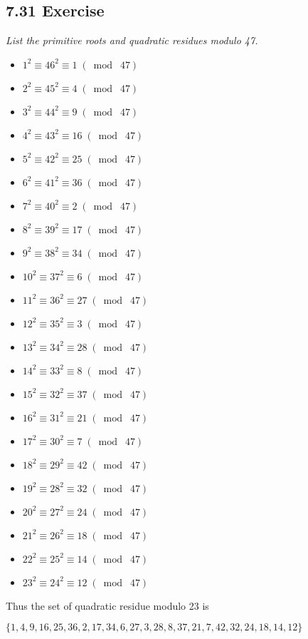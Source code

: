 \documentclass{article}
\begin{document}
\subsection*{7.31 Exercise} 
\quad \textit{List the primitive roots and quadratic residues modulo 47.}
\begin{itemize}
    \item $1^2 \equiv 46^2 \equiv 1 \;(\bmod\; 47)$
    \item $2^2 \equiv 45^2 \equiv 4 \;(\bmod\; 47)$
    \item $3^2 \equiv 44^2 \equiv 9 \;(\bmod\; 47)$
    \item $4^2 \equiv 43^2 \equiv 16 \;(\bmod\; 47)$
    \item $5^2 \equiv 42^2 \equiv 25 \;(\bmod\; 47)$
    \item $6^2 \equiv 41^2 \equiv 36 \;(\bmod\; 47)$
    \item $7^2 \equiv 40^2 \equiv 2 \;(\bmod\; 47)$
    \item $8^2 \equiv 39^2 \equiv 17 \;(\bmod\; 47)$
    \item $9^2 \equiv 38^2 \equiv 34 \;(\bmod\; 47)$
    \item $10^2 \equiv 37^2 \equiv 6 \;(\bmod\; 47)$
    \item $11^2 \equiv 36^2 \equiv 27\;(\bmod\; 47)$
    \item $12^2 \equiv 35^2 \equiv 3 \;(\bmod\; 47)$
    \item $13^2 \equiv 34^2 \equiv 28 \;(\bmod\; 47)$
    \item $14^2 \equiv 33^2 \equiv 8 \;(\bmod\; 47)$
    \item $15^2 \equiv 32^2 \equiv 37 \;(\bmod\; 47)$
    \item $16^2 \equiv 31^2 \equiv 21 \;(\bmod\; 47)$
    \item $17^2 \equiv 30^2 \equiv 7 \;(\bmod\; 47)$
    \item $18^2 \equiv 29^2 \equiv 42 \;(\bmod\; 47)$
    \item $19^2 \equiv 28^2 \equiv 32 \;(\bmod\; 47)$
    \item $20^2 \equiv 27^2 \equiv 24 \;(\bmod\; 47)$
    \item $21^2 \equiv 26^2 \equiv 18 \;(\bmod\; 47)$
    \item $22^2 \equiv 25^2 \equiv 14 \;(\bmod\; 47)$
    \item $23^2 \equiv 24^2 \equiv 12 \;(\bmod\; 47)$
\end{itemize}
Thus the set of quadratic residue modulo 23 is
\begin{center}
    $\{1,4,9,16,25,36,2,17,34,6,27,3,28,8,37,21,7,42,32,24,18,14,12\}$
\end{center}
\end{document}
